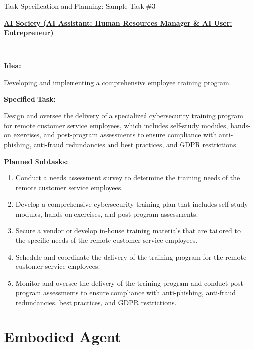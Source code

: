 \begin{AIBox}{Task Specification and Planning: Sample Task \#3}

	\parbox[t]{\textwidth}{
		{\bf\underline{AI Society (AI Assistant: Human Resources Manager
					\& AI User: Entrepreneur)}}
	}\\

	\parbox[t]{\textwidth}{
		{\bf{Idea:}}

		Developing and implementing a comprehensive employee training program.
		\\
	}
	\parbox[t]{\textwidth}{
		{\bf{Specified Task:}}

		Design and oversee the delivery of a specialized cybersecurity training program for remote customer service employees, which includes self-study modules, hands-on exercises, and post-program assessments to ensure compliance with anti-phishing, anti-fraud redundancies and best practices, and GDPR restrictions.
		\\}
	\parbox[t]{\textwidth}{
		{\bf{Planned Subtasks:}}
		\begin{enumerate}
			\item Conduct a needs assessment survey to determine the training needs of the remote customer service employees.
			\item Develop a comprehensive cybersecurity training plan that includes self-study modules, hands-on exercises, and post-program assessments.
			\item Secure a vendor or develop in-house training materials that are tailored to the specific needs of the remote customer service employees.
			\item Schedule and coordinate the delivery of the training program for the remote customer service employees.
			\item Monitor and oversee the delivery of the training program and conduct post-program assessments to ensure compliance with anti-phishing, anti-fraud redundancies, best practices, and GDPR restrictions.

		\end{enumerate}
	}
\end{AIBox}


\clearpage
\section{Embodied Agent}

